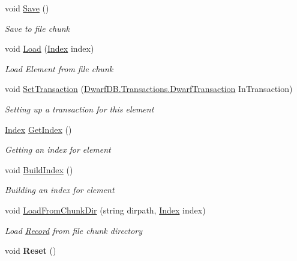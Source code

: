 \begin{DoxyCompactItemize}
\item 
void \hyperlink{class_dwarf_d_b_1_1_data_structures_1_1_record_a01889e57146fd3882228b09d2d54d51c}{Save} ()
\begin{DoxyCompactList}\small\item\em Save to file chunk \end{DoxyCompactList}\item 
void \hyperlink{class_dwarf_d_b_1_1_data_structures_1_1_record_aba01a54cf8111326625980fd9b1d4d92}{Load} (\hyperlink{class_dwarf_d_b_1_1_data_structures_1_1_index}{Index} index)
\begin{DoxyCompactList}\small\item\em Load Element from file chunk \end{DoxyCompactList}\item 
void \hyperlink{class_dwarf_d_b_1_1_data_structures_1_1_record_a4997c638afaaa5b8f281a492b639dfca}{Set\+Transaction} (\hyperlink{class_dwarf_d_b_1_1_transactions_1_1_dwarf_transaction}{Dwarf\+D\+B.\+Transactions.\+Dwarf\+Transaction} In\+Transaction)
\begin{DoxyCompactList}\small\item\em Setting up a transaction for this element \end{DoxyCompactList}\item 
\hyperlink{class_dwarf_d_b_1_1_data_structures_1_1_index}{Index} \hyperlink{class_dwarf_d_b_1_1_data_structures_1_1_record_abf7b1ed28e2f443a17f7658222b59c8f}{Get\+Index} ()
\begin{DoxyCompactList}\small\item\em Getting an index for element \end{DoxyCompactList}\item 
void \hyperlink{class_dwarf_d_b_1_1_data_structures_1_1_record_ab4ae005ad5474eb98a8aa45d7f8dd195}{Build\+Index} ()
\begin{DoxyCompactList}\small\item\em Building an index for element \end{DoxyCompactList}\item 
void \hyperlink{class_dwarf_d_b_1_1_data_structures_1_1_record_a81ac5ba44d5682bfba61592af0195cd0}{Load\+From\+Chunk\+Dir} (string dirpath, \hyperlink{class_dwarf_d_b_1_1_data_structures_1_1_index}{Index} index)
\begin{DoxyCompactList}\small\item\em Load \hyperlink{class_dwarf_d_b_1_1_data_structures_1_1_record}{Record} from file chunk directory \end{DoxyCompactList}\item 
\hypertarget{class_dwarf_d_b_1_1_data_structures_1_1_record_aefa85cab909d8d9b60aeabbb23bbc5c7}{void {\bfseries Reset} ()}\label{class_dwarf_d_b_1_1_data_structures_1_1_record_aefa85cab909d8d9b60aeabbb23bbc5c7}


\end{DoxyCompactItemize}
